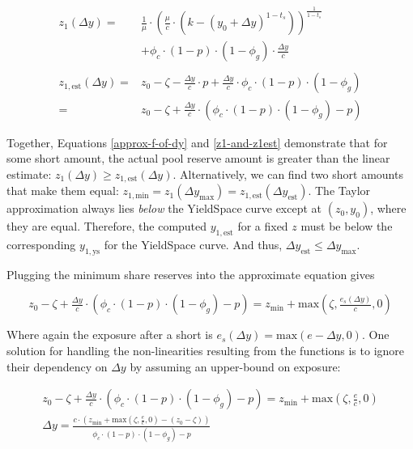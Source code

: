 \begin{equation}\label{z1-and-z1est}
\begin{aligned}
    z_1(\Delta y) = &\tfrac{1}{\mu}
    \cdot \left( \tfrac{\mu}{c} \cdot \left( k - (y_0 + \Delta y)^{1 - t_s} \right) \right)^{\tfrac{1}{1 - t_s}} \\
    &+ \phi_c \cdot (1 - p) \cdot (1 - \phi_g) \cdot \tfrac{\Delta y}{c} \\
    \\
    z_{1,\text{est}}(\Delta y) = &z_0 - \zeta - \tfrac{\Delta y}{c} \cdot p + \tfrac{\Delta y}{c} \cdot \phi_c \cdot (1 - p) \cdot (1 - \phi_g) \\
    = &z_0 - \zeta + \tfrac{\Delta y}{c} \cdot \left( \phi_c \cdot (1 - p) \cdot (1 - \phi_g) - p \right)
\end{aligned}
\end{equation}

Together, Equations \eqref{approx-f-of-dy} and \eqref{z1-and-z1est} demonstrate that for some short amount, the actual pool reserve amount is greater than the linear estimate: $z_1(\Delta y) \ge z_{1,\text{est}}(\Delta y)$.
Alternatively, we can find two short amounts that make them equal: $z_{1,\text{min}} = z_1(\Delta y_{\text{max}}) = z_{1,\text{est}}(\Delta y_{\text{est}})$.
The Taylor approximation always lies \emph{below} the YieldSpace curve except at $(z_0, y_0)$, where they are equal.
Therefore, the computed $y_{1,\text{est}}$ for a fixed $z$ must be below the corresponding $y_{1,\text{ys}}$ for the YieldSpace curve.
And thus, $\Delta y_{\text{est}} \le \Delta y_{\text{max}}$.

\newpage

\label{conservative-abs-max}

Plugging the minimum share reserves into the approximate equation gives

\begin{equation}
    z_0 - \zeta + \tfrac{\Delta y}{c} \cdot \left( \phi_c \cdot (1 - p) \cdot (1 - \phi_g) - p \right) = z_{\text{min}} + \text{max}\left( \zeta, \tfrac{e_s(\Delta y)}{c}, 0 \right)
\end{equation}

Where again the exposure after a short is $e_s(\Delta y) = \text{max}(e - \Delta y, 0)$.
One solution for handling the non-linearities resulting from the  functions is to ignore their dependency on $\Delta y$ by assuming an upper-bound on exposure:

\begin{equation}
\begin{split}
    z_0 - \zeta + \tfrac{\Delta y}{c} \cdot \left( \phi_c \cdot (1 - p) \cdot (1 - \phi_g) - p \right) = z_{\text{min}} + \text{max}\left( \zeta, \tfrac{e}{c}, 0 \right)  \\
    \Delta y = \frac{c \cdot \left( z_{\text{min}} + \text{max}\left( \zeta, \tfrac{e}{c}, 0 \right) - \left( z_0 - \zeta \right) \right)}{\phi_c \cdot (1 - p) \cdot (1 - \phi_g) - p}
\end{split}
\end{equation}

